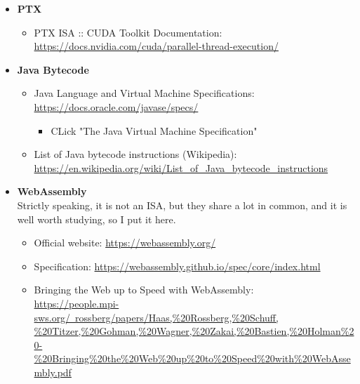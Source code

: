 \documentclass{article}
\begin{document}
\begin{itemize}
    \item \textbf{PTX}
    \begin{itemize}
        \item PTX ISA :: CUDA Toolkit Documentation:\\
        \href{https://docs.nvidia.com/cuda/parallel-thread-execution/}{https://docs.nvidia.com/cuda/parallel-thread-execution/}
    \end{itemize}
    \item \textbf{Java Bytecode}
    \begin{itemize}
        \item Java Language and Virtual Machine Specifications:\\
    \href{https://docs.oracle.com/javase/specs/}{https://docs.oracle.com/javase/specs/}
    \begin{itemize}
        \item CLick "The Java Virtual Machine Specification"
    \end{itemize}
    \item List of Java bytecode instructions (Wikipedia):\\
    \href{https://en.wikipedia.org/wiki/List_of_Java_bytecode_instructions}{https://en.wikipedia.org/wiki/List\_of\_Java\_bytecode\_instructions}
    \end{itemize}
    \item \textbf{WebAssembly}\label{WASM}\\
    Strictly speaking, it is not an ISA, but they share a lot in common, and it is well worth studying, so I put it here.
    \begin{itemize}
        \item Official website:
        \href{https://webassembly.org/}{https://webassembly.org/}
        \item Specification:
        \href{https://webassembly.github.io/spec/core/index.html}{https://webassembly.github.io/spec/core/index.html}
        \item Bringing the Web up to Speed with WebAssembly:\\
        \href{https://people.mpi-sws.org/~rossberg/papers/Haas,\%20Rossberg,\%20Schuff,\%20Titzer,\%20Gohman,\%20Wagner,\%20Zakai,\%20Bastien,\%20Holman\%20-\%20Bringing\%20the\%20Web\%20up\%20to\%20Speed\%20with\%20WebAssembly.pdf}{https://people.mpi-sws.org/~rossberg/papers/Haas,\%20Rossberg,\%20Schuff,\\
        \%20Titzer,\%20Gohman,\%20Wagner,\%20Zakai,\%20Bastien,\%20Holman\%20-\\
        \%20Bringing\%20the\%20Web\%20up\%20to\%20Speed\%20with\%20WebAssembly.pdf}
    \end{itemize}
\end{itemize}
\end{document}
